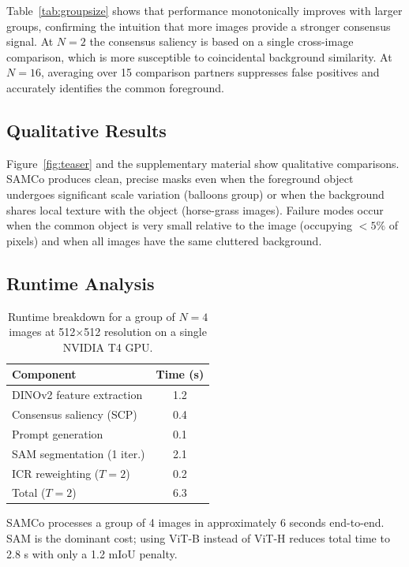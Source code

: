 \documentclass[10pt,twocolumn,letterpaper]{article}
\begin{document}
Table~\ref{tab:groupsize} shows that performance monotonically improves with
larger groups, confirming the intuition that more images provide a stronger
consensus signal.
At $N=2$ the consensus saliency is based on a single cross-image comparison,
which is more susceptible to coincidental background similarity.
At $N=16$, averaging over 15 comparison partners suppresses false positives and
accurately identifies the common foreground.

\subsection{Qualitative Results}

Figure~\ref{fig:teaser} and the supplementary material show qualitative
comparisons.
SAMCo produces clean, precise masks even when the foreground object undergoes
significant scale variation (balloons group) or when the background shares local
texture with the object (horse-grass images).
Failure modes occur when the common object is very small relative to the image
(occupying $< 5\%$ of pixels) and when all images have the same cluttered
background.

\subsection{Runtime Analysis}

\begin{table}[t]
\centering
\caption{Runtime breakdown for a group of $N=4$ images at 512$\times$512
resolution on a single NVIDIA T4 GPU.}
\label{tab:runtime}
\begin{tabular}{@{}lc@{}}
\toprule
Component & Time (s) \\
\midrule
DINOv2 feature extraction       & 1.2 \\
Consensus saliency (SCP)        & 0.4 \\
Prompt generation               & 0.1 \\
SAM segmentation (1 iter.)      & 2.1 \\
ICR reweighting ($T=2$)         & 0.2 \\
\midrule
Total ($T=2$)                   & 6.3 \\
\bottomrule
\end{tabular}
\end{table}

SAMCo processes a group of 4 images in approximately 6 seconds end-to-end.
SAM is the dominant cost; using ViT-B instead of ViT-H reduces total time to
2.8 s with only a 1.2 mIoU penalty.
\end{document}
